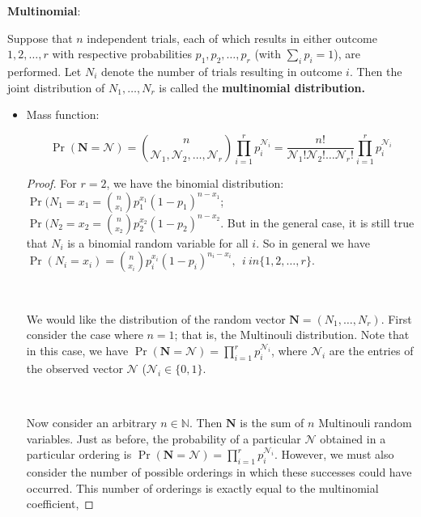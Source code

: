 \textbf{Multinomial}: 

\begin{definition}\label{prob.ross.multinomial.dist.def} Suppose that \(n\) independent trials, each of which results in either outcome \(1, 2, \ldots, r\) with respective probabilities \(p_1, p_2, \ldots, p_r\) (with \(\sum_{i} p_i = 1\)), are performed. Let \(N_i\) denote the number of trials resulting in outcome \(i\). Then the joint distribution of \(N_1, \ldots, N_r\) is called the \textbf{multinomial distribution.}

\end{definition}

\begin{itemize}

\item Mass function:

\[
\Pr(\boldsymbol{N} = \boldsymbol{\mathcal{N}}) = \binom{n}{\mathcal{N}_1, \mathcal{N}_2, \ldots, \mathcal{N}_r} \prod_{i=1}^r p_i^{\mathcal{N}_i} = \frac{n!}{\mathcal{N}_1! \mathcal{N}_2! \ldots \mathcal{N}_r!}\prod_{i=1}^r p_i^{\mathcal{N}_i} 
\]

\begin{proof}
For \(r=2\), we have the binomial distribution: \(\Pr(N_1 = x_1 = \binom{n}{x_1}p_1^{x_1}(1 - p_1)^{n-x_1}\); \(\Pr(N_2 = x_2 = \binom{n}{x_2}p_2^{x_2}(1 - p_2)^{n-x_2}\). But in the general case, it is still true that \(N_i\) is a binomial random variable for all \(i\). So in general we have \(\Pr(N_i = x_i) = \binom{n}{x_i} p_i^{x_i}(1-p_i)^{n_i -x_i}, \ \ i \ in \{1, 2, \ldots, r\}\).

\

We would like the distribution of the random vector \(\boldsymbol{N} = (N_1, \ldots, N_r)\). First consider the case where \(n=1\); that is, the Multinouli distribution. Note that in this case, we have \(\Pr(\boldsymbol{N} = \boldsymbol{\mathcal{N}}) = \prod_{i=1}^r p_i^{\mathcal{N}_i}\), where \(\mathcal{N}_i\) are the entries of the observed vector \(\boldsymbol{\mathcal{N}}\) (\(\mathcal{N}_i \in \{0, 1\}\).

\

Now consider an arbitrary \(n \in \mathbb{N}\). Then \(\boldsymbol{N}\) is the sum of \(n\) Multinouli random variables. Just as before, the probability of a particular \(\boldsymbol{\mathcal{N}}\) obtained in a particular ordering is \(\Pr(\boldsymbol{N} = \boldsymbol{\mathcal{N}}) = \prod_{i=1}^r p_i^{\mathcal{N}_i}\). However, we must also consider the number of possible orderings in which these successes could have occurred. This number of orderings is exactly equal to the multinomial coefficient,


\end{proof}
\end{itemize}

